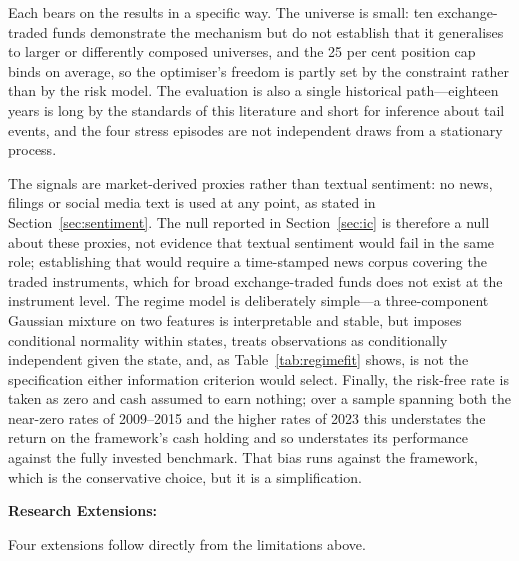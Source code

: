 Each bears on the results in a specific way. The universe is small: ten exchange-traded
funds demonstrate the mechanism but do not establish that it generalises to larger or
differently composed universes, and the 25 per cent position cap binds on average, so the
optimiser's freedom is partly set by the constraint rather than by the risk model. The
evaluation is also a single historical path---eighteen years is long by the standards of
this literature and short for inference about tail events, and the four stress episodes
are not independent draws from a stationary process.

The signals are market-derived proxies rather than textual sentiment: no news, filings or
social media text is used at any point, as stated in Section~\ref{sec:sentiment}. The
null reported in Section~\ref{sec:ic} is therefore a null about these proxies, not
evidence that textual sentiment would fail in the same role; establishing that would
require a time-stamped news corpus covering the traded instruments, which for broad
exchange-traded funds does not exist at the instrument level. The regime model is
deliberately simple---a three-component Gaussian mixture on two features is interpretable
and stable, but imposes conditional normality within states, treats observations as
conditionally independent given the state, and, as Table~\ref{tab:regimefit} shows, is
not the specification either information criterion would select. Finally, the risk-free
rate is taken as zero and cash assumed to earn nothing; over a sample spanning both the
near-zero rates of 2009--2015 and the higher rates of 2023 this understates the return on
the framework's cash holding and so understates its performance against the fully
invested benchmark. That bias runs against the framework, which is the conservative
choice, but it is a simplification.

\textbf{Research Extensions:}

Four extensions follow directly from the limitations above.

